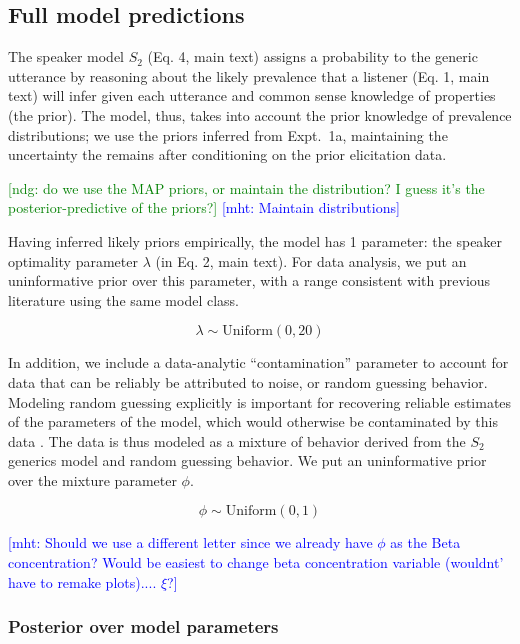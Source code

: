 \documentclass[10pt,letterpaper]{article}
\newcommand{\ndg}[1]{\textcolor{Green}{[ndg: #1]}}
\newcommand{\mht}[1]{\textcolor{Blue}{[mht: #1]}}
\begin{document}
\subsection{Full model predictions}
\label{sec:posteriorbda1}
The speaker model $S_2$ (Eq. 4, main text) assigns a probability to the generic utterance by reasoning about the likely prevalence that a listener (Eq. 1, main text) will infer given each utterance and common sense knowledge of properties (the prior). 
The model, thus, takes into account the prior knowledge of prevalence distributions; we use the priors inferred from Expt.~1a, maintaining the uncertainty the remains after conditioning on the prior elicitation data. 

\ndg{do we use the MAP priors, or maintain the distribution? I guess it's the posterior-predictive of the priors?} 
\mht{Maintain distributions}


Having inferred likely priors empirically, the model has 1 parameter: the speaker optimality parameter $\lambda$ (in Eq. 2, main text). 
For data analysis, we put an uninformative prior over this parameter, with a range consistent with previous literature using the same model class.

$$
\lambda \sim \text{Uniform}(0,20)
$$

In addition, we include a data-analytic ``contamination'' parameter to account for data that can be reliably be attributed to noise, or random guessing behavior.
Modeling random guessing explicitly is important for recovering reliable estimates of the parameters of the model, which would otherwise be contaminated by this data \cite{LW2014}.
The data is thus modeled as a mixture of behavior derived from the $S_2$ generics model and random guessing behavior. 
We put an uninformative prior over the mixture parameter $\phi$.

$$
\phi \sim \text{Uniform}(0,1)
$$

\mht{Should we use a different letter since we already have $\phi$ as the Beta concentration? Would be easiest to change beta concentration variable (wouldnt' have to remake plots).... $\xi$?}


\subsubsection{Posterior over model parameters}
\end{document}
